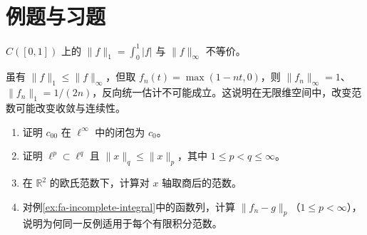 \section{例题与习题}
\begin{example}[不同范数的作用]
$C([0,1])$ 上的 $\|f\|_1=\int_0^1|f|$ 与 $\|f\|_\infty$ 不等价。
\end{example}
\begin{solve}
虽有 $\|f\|_1\leq\|f\|_\infty$，但取 $f_n(t)=\max(1-nt,0)$，则 $\|f_n\|_\infty=1$、$\|f_n\|_1=1/(2n)$，反向统一估计不可能成立。这说明在无限维空间中，改变范数可能改变收敛与连续性。
\end{solve}
\begin{enumerate}
 \item 证明 $c_{00}$ 在 $\ell^\infty$ 中的闭包为 $c_0$。
 \item\label{exer:fa-lp-inclusion} 证明 $\ell^p\subset\ell^q$ 且 $\|x\|_q\leq\|x\|_p$，其中 $1\leq p<q\leq\infty$。
 \item 在 $\mathbb R^2$ 的欧氏范数下，计算对 $x$ 轴取商后的范数。
 \item 对例\ref{ex:fa-incomplete-integral}中的函数列，计算 $\|f_n-g\|_p$（$1\leq p<\infty$），说明为何同一反例适用于每个有限积分范数。
\end{enumerate}

